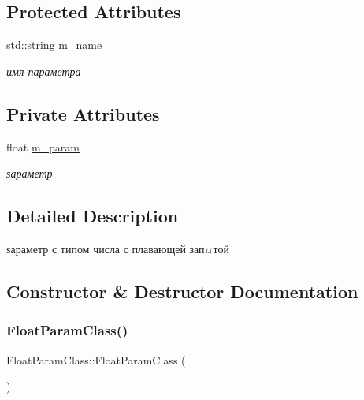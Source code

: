 \subsection*{Protected Attributes}
\begin{DoxyCompactItemize}
\item 
std\+::string \hyperlink{class_set_param_class_aab204889210304af482b414a6f8dbe82}{m\+\_\+name}
\begin{DoxyCompactList}\small\item\em имя параметра \end{DoxyCompactList}\end{DoxyCompactItemize}
\subsection*{Private Attributes}
\begin{DoxyCompactItemize}
\item 
float \hyperlink{class_float_param_class_aa6dd385fb895519b12f6c7fe1bd0c6b5}{m\+\_\+param}
\begin{DoxyCompactList}\small\item\em ѕараметр \end{DoxyCompactList}\end{DoxyCompactItemize}


\subsection{Detailed Description}
ѕараметр с типом числа с плавающей зап¤той 

\subsection{Constructor \& Destructor Documentation}
\mbox{\label{class_float_param_class_af9b305187fda86a00e3aa67706f7d868}} 
\subsubsection{\texorpdfstring{Float\+Param\+Class()}{FloatParamClass()}\hspace{0.1cm}{\footnotesize\ttfamily [1/2]}}
{\footnotesize\ttfamily Float\+Param\+Class\+::\+Float\+Param\+Class (\begin{DoxyParamCaption}{ }\end{DoxyParamCaption})}

